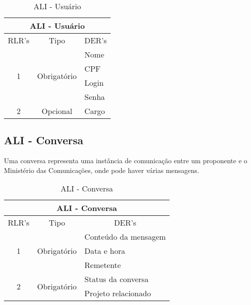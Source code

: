       \begin{table}[!h]
      \centering
      \caption{ALI - Usuário}
      \label{ali_usuario}
      \begin{tabular}{|c|c|l|}
      \hline
      \multicolumn{3}{|c|}{ALI - Usuário}                                                     \\ \hline
      \multicolumn{1}{|l|}{RLR's} & Tipo                         & \multicolumn{1}{c|}{DER's} \\ \hline
      \multirow{4}{*}{1}          & \multirow{4}{*}{Obrigatório} & Nome                       \\ \cline{3-3} 
				  &                              & CPF                        \\ \cline{3-3} 
				  &                              & Login                      \\ \cline{3-3} 
				  &                              & Senha                      \\ \hline
      2                           & Opcional                     & Cargo                      \\ \hline
      \end{tabular}
      \end{table}
      
  \subsection{ALI - Conversa}
    
      Uma conversa representa uma instância de comunicação entre um proponente e o Ministério das Comunicações,
      onde pode haver várias mensagens.
    
      \begin{table}[!h]
      \centering
      \caption{ALI - Conversa}
      \label{my-label}
      \begin{tabular}{|c|c|l|}
      \hline
      \multicolumn{3}{|c|}{ALI - Conversa}                                                    \\ \hline
      \multicolumn{1}{|l|}{RLR's} & Tipo                         & \multicolumn{1}{c|}{DER's} \\ \hline
      \multirow{3}{*}{1}          & \multirow{3}{*}{Obrigatório} & Conteúdo da mensagem       \\ \cline{3-3} 
				  &                              & Data e hora                \\ \cline{3-3} 
				  &                              & Remetente                  \\ \hline
      \multirow{2}{*}{2}          & \multirow{2}{*}{Obrigatório} & Status da conversa         \\ \cline{3-3} 
				  &                              & Projeto relacionado        \\ \hline
      \end{tabular}
      \end{table}
      
